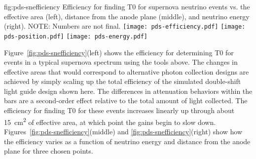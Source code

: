 \begin{dunefigure}{fig:pds-snefficiency}
{Efficiency for finding T0 for supernova neutrino events vs. the effective area (left), distance from the anode plane (middle), and neutrino energy (right). NOTE: Numbers are not final.}
  \texttt{[image: pds-efficiency.pdf]}
  \texttt{[image: pds-position.pdf]}
  \texttt{[image: pds-energy.pdf]}
\end{dunefigure}

Figure~\ref{fig:pds-snefficiency}(left) shows the efficiency for determining T0 for events in a typical supernova spectrum using the tools above. The changes in effective areas that would correspond to alternative photon collection designs are achieved by simply scaling up the total efficiency of the simulated double-shift light guide design shown here. The differences in attenuation behaviors within the bars are a second-order effect relative to the total amount of light collected. The efficiency for finding T0 for these events increases linearly up through about \SI{15}{cm^2} of effective area, at which point the gains begin to slow down. Figures~\ref{fig:pds-snefficiency}(middle) and \ref{fig:pds-snefficiency}(right) show how the efficiency varies as a function of neutrino energy and distance from the anode plane for three chosen points.


